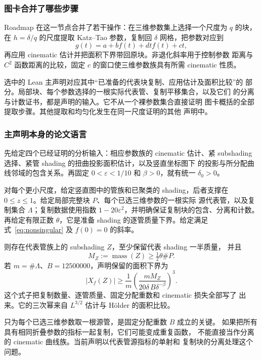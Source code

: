 \documentclass[UTF8,11pt,a4paper,fontset=none]{ctexart}
\newcommand{\eps}{\varepsilon}
\newcommand{\mass}{\operatorname{mass}}
\begin{document}
\subsubsection{图卡合并了哪些步骤}

Roadmap 在这一节点合并了若干操作：在三维参数集上选择一个尺度为
$q$ 的块，在 $h=\delta/q$ 的尺度提取 Katz--Tao 参数，复制回
$\delta$ 网格，把参数对应到
\[
 g(t)=a+bf(t)+dtf(t)+ct,
\]
再应用 cinematic 估计并把面积下界带回原块。非退化斜率用于控制参数
距离与 $C^2$ 函数距离的比较，固定 $c$ 的窗口使三维参数族具有所需
cinematic 性质。

选中的 Lean 主声明对应其中“已准备的代表块复制、应用估计及面积比较”的
部分。局部块、每个参数选择的一根实际代表管、复制平移集合，以及它们
的分离与计数证书，都是声明的输入。它不从一个裸参数集合直接证明
图卡概括的全部提取步骤。其他提取和均匀化发生在同一尺度证明的其他
声明中。

\subsubsection{主声明本身的论文语言}

先给定四个已经证明的分析输入：相应参数族的 cinematic 估计、紧
subshading 选择、紧管 shading 的扭曲投影面积估计，以及竖直坐标图下
的投影与所分配曲线邻域的包含关系。再固定
$0<\eps<1/10$ 和 $\beta>0$，就有统一 $\delta_0>0$。

对每个更小尺度，给定竖直图中的管族和已聚类的 shading，后者支撑在
$0\leq z\leq1$。给定局部完整块 $P$、每个已选三维参数的一根实际
源代表管，以及复制集合 $\Lambda$；复制数据使用指数
$1-20\eps^2$，并明确保证复制块的包含、分离和计数。再给定有限正数
$\theta$，它是准备 shading 的逐管质量下界。给定满足
式~\eqref{eq:nonsingular} 及 $f(0)=0$ 的斜率。

则存在代表管族上的 subshading $Z$，至少保留代表 shading 一半质量，
并且
\begin{equation}\label{eq:jet-mass}
 M_Z:=\mass(Z)\geq\tfrac12\theta\#P.
\end{equation}
若 $m=\#\Lambda$、$B=12500000$，声明保留的面积下界为
\begin{equation}\label{eq:jet-volume}
 |X_f(Z)|\geq\frac1m
       \left(\frac{m M_Z}{20\delta\, B\delta^{-\beta}}\right)^3.
\end{equation}
这个式子把复制数量、逐管质量、固定分配重数和 cinematic 损失全部写了
出来。它的三次幂来自 $L^{3/2}$ 估计与 Hölder 的面积比较。

只为每个已选三维参数取一根源管，是固定分配重数 $B$ 成立的关键。
如果把所有具有相同折叠参数的指标一起复制，它们可能变成重复函数，
不能直接当作分离的 cinematic 曲线族。当前声明以代表管源指标的单射和
复制块的分离处理这个问题。
\end{document}

